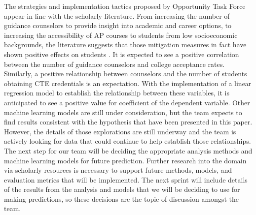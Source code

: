 The strategies and implementation tactics proposed by Opportunity Task Force appear in line with the scholarly literature. 
From increasing the number of guidance counselors to provide insight into academic and career options, to increasing the accessibility of AP courses to students from low socioeconomic backgrounds, the literature suggests that those mitigation measures in fact have shown positive effects on students \parencite[][]{castleman2014intensive}.
It is expected to see a positive correlation between the number of guidance counselors and college acceptance rates. 
Similarly, a positive relationship between counselors and the number of students obtaining CTE credentials is an expectation. 
With the implementation of a linear regression model to establish the relationship between these variables, it is anticipated to see a positive value for coefficient of the dependent variable. 
Other machine learning models are still under consideration, but the team expects to find results consistent with the hypothesis that have been presented in this paper. 
However, the details of those explorations are still underway and the team is actively looking for data that could continue to help establish those relationships. 
The next step for our team will be deciding the appropriate analysis methods and machine learning models for future prediction. 
Further research into the domain via scholarly resources is necessary to support future methods, models, and evaluation metrics that will be implemented.
The next sprint will include details of the results from the analysis and models that we will be deciding to use for making predictions, so these decisions are the topic of discussion amongst the team.
